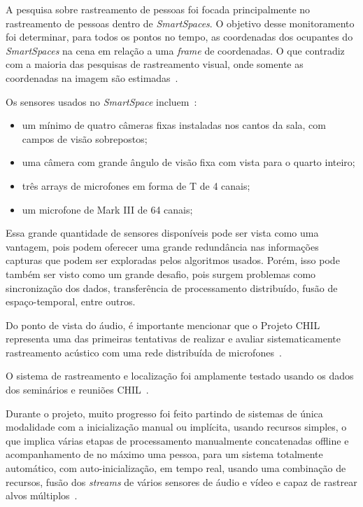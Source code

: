 A pesquisa sobre rastreamento de pessoas foi focada principalmente no rastreamento de pessoas dentro de \textit{SmartSpaces}. O objetivo desse monitoramento foi determinar, para todos os pontos no tempo, as coordenadas dos ocupantes do \textit{SmartSpaces} na cena em relação a uma \textit{frame} de coordenadas. O que contradiz com a maioria das pesquisas de rastreamento visual, onde somente as coordenadas na imagem  são estimadas~\cite{chil}.

Os sensores usados no \textit{SmartSpace} incluem~\cite{chil}:
	
	\begin{itemize}
		\item um mínimo de quatro câmeras fixas instaladas nos cantos da sala, com campos de visão sobrepostos;
		\item uma câmera com grande ângulo de visão fixa com vista para o quarto inteiro;
		\item três arrays de microfones em forma de T de 4 canais;
		\item um microfone de Mark III de 64 canais;
	\end{itemize}

Essa grande quantidade de sensores disponíveis pode ser vista como uma vantagem, pois podem oferecer uma grande redundância nas informações capturas que podem ser exploradas pelos algoritmos usados. Porém, isso pode também ser visto como um grande desafio, pois surgem problemas como sincronização dos dados, transferência de processamento distribuído, fusão de espaço-temporal, entre outros.

Do ponto de vista do áudio, é importante mencionar que o Projeto CHIL representa uma das primeiras tentativas de realizar e avaliar sistematicamente rastreamento acústico com uma rede distribuída de microfones~\cite{chil}.
	 
O sistema de rastreamento e localização foi amplamente testado usando os dados dos seminários e reuniões CHIL~\cite{chil}.

Durante o projeto, muito progresso foi feito partindo de sistemas de única modalidade com a inicialização manual ou implícita, usando recursos simples, o que implica várias etapas de processamento manualmente concatenadas offline e acompanhamento de no máximo uma pessoa, para um sistema totalmente automático, com auto-inicialização, em tempo real, usando uma combinação de recursos, fusão dos \textit{streams} de vários sensores de áudio e vídeo e capaz de rastrear alvos múltiplos~\cite{chil}.

